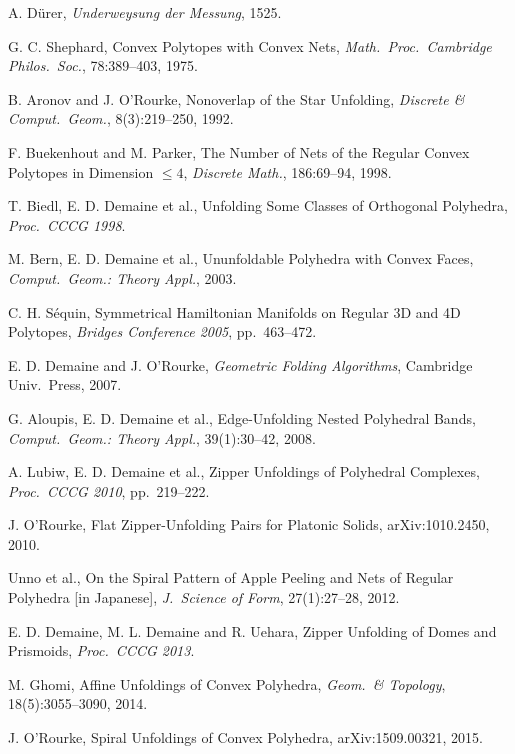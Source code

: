 \documentclass[a4paper,11pt]{article}
\begin{document}
\begin{enumerate}[label={[\arabic*]}, leftmargin=2em]
  \item A. D\"{u}rer, \textit{Underweysung der Messung}, 1525.
  \item G. C. Shephard, Convex Polytopes with Convex Nets,
        \textit{Math.\ Proc.\ Cambridge Philos.\ Soc.}, 78:389--403, 1975.
  \item B. Aronov and J. O'Rourke, Nonoverlap of the Star Unfolding,
        \textit{Discrete \& Comput.\ Geom.}, 8(3):219--250, 1992.
  \item F. Buekenhout and M. Parker, The Number of Nets of the Regular Convex Polytopes
        in Dimension $\leq 4$,
        \textit{Discrete Math.}, 186:69--94, 1998.
  \item T. Biedl, E. D. Demaine et al., Unfolding Some Classes of Orthogonal Polyhedra,
        \textit{Proc.\ CCCG 1998}.
  \item M. Bern, E. D. Demaine et al., Ununfoldable Polyhedra with Convex Faces,
        \textit{Comput.\ Geom.: Theory Appl.}, 2003.
  \item C. H. S\'{e}quin, Symmetrical Hamiltonian Manifolds on Regular 3D and 4D Polytopes,
        \textit{Bridges Conference 2005}, pp.~463--472.
  \item E. D. Demaine and J. O'Rourke, \textit{Geometric Folding Algorithms},
        Cambridge Univ.\ Press, 2007.
  \item G. Aloupis, E. D. Demaine et al., Edge-Unfolding Nested Polyhedral Bands,
        \textit{Comput.\ Geom.: Theory Appl.}, 39(1):30--42, 2008.
  \item A. Lubiw, E. D. Demaine et al., Zipper Unfoldings of Polyhedral Complexes,
        \textit{Proc.\ CCCG 2010}, pp.~219--222.
  \item J. O'Rourke, Flat Zipper-Unfolding Pairs for Platonic Solids,
        arXiv:1010.2450, 2010.
  \item Unno et al., On the Spiral Pattern of Apple Peeling and Nets of Regular Polyhedra
        [in Japanese],
        \textit{J.\ Science of Form}, 27(1):27--28, 2012.
  \item E. D. Demaine, M. L. Demaine and R. Uehara, Zipper Unfolding of Domes and Prismoids,
        \textit{Proc.\ CCCG 2013}.
  \item M. Ghomi, Affine Unfoldings of Convex Polyhedra,
        \textit{Geom.\ \& Topology}, 18(5):3055--3090, 2014.
  \item J. O'Rourke, Spiral Unfoldings of Convex Polyhedra,
        arXiv:1509.00321, 2015.

\end{enumerate}
\end{document}
